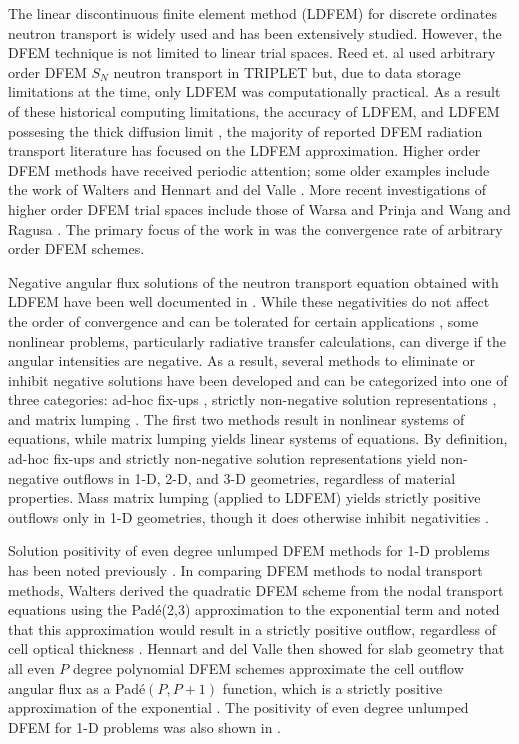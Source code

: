 The linear discontinuous finite element method (LDFEM) for discrete ordinates neutron transport is widely used and has been extensively studied\cite{ld_fine_mesh,hamilton,csz,adams}.  
However, the DFEM technique is not limited to linear trial spaces.
Reed et. al \cite{reed} used arbitrary order DFEM $S_N$ neutron transport in TRIPLET but, due to data storage limitations at the time, only LDFEM was computationally practical.
As a result of these historical computing limitations,  the accuracy of LDFEM\cite{larsen_nelson}, and LDFEM possesing the thick diffusion limit \cite{larsen_morel_asymptotics},
the majority of reported DFEM radiation transport literature has focused on the LDFEM approximation.
Higher order DFEM methods have received periodic attention; some older examples include the work of Walters \cite{walters} and Hennart and del Valle \cite{hennart_delvalle_2,hennart_delvalle_3}.
More recent investigations of higher order DFEM trial spaces include those of  Warsa and Prinja \cite{warsa_prinja} and Wang and Ragusa \cite{yaqi_ragusa,yaqi_ragusa2}.  
The primary focus of the work in \cite{hennart_delvalle_2,hennart_delvalle_3, warsa_prinja, yaqi_ragusa, yaqi_ragusa2} was the convergence rate of arbitrary order DFEM schemes. 

Negative angular flux solutions of the neutron transport equation obtained with LDFEM have been well documented in \cite{hamilton,csz,adams}.  
While these negativities do not affect the order of convergence and can be tolerated for certain applications \cite{lathrop}, some nonlinear problems, particularly radiative transfer calculations, can diverge if the angular intensities are negative.  
As a result, several methods to eliminate or inhibit negative solutions have been developed and can be categorized into one of three categories: ad-hoc fix-ups  \cite{hamilton}, strictly non-negative solution representations \cite{csz}, and matrix lumping \cite{adams}.  
The first two methods result in nonlinear systems of equations, while matrix lumping yields linear systems of equations.  
By definition, ad-hoc fix-ups and strictly non-negative solution representations yield non-negative outflows in 1-D, 2-D, and 3-D geometries, regardless of material properties.  
Mass matrix lumping (applied to LDFEM) yields strictly positive outflows only in 1-D geometries, though it does otherwise inhibit negativities \cite{adams}.   

Solution positivity of even degree unlumped DFEM methods for 1-D problems has been noted previously \cite{walters,hennart_delvalle_2,hennart_delvalle_3}.
In comparing DFEM methods to nodal transport methods, Walters derived the quadratic DFEM scheme from the nodal transport equations using the Pad\'{e}(2,3) approximation to the exponential term and noted that this approximation would result in a strictly positive outflow, regardless of cell optical thickness \cite{walters}.
Hennart and del Valle then showed for slab geometry that all even $P$ degree polynomial DFEM schemes approximate the cell outflow angular flux as a Pad\'{e}$(P,P+1)$ function, which is a strictly positive approximation of the exponential \cite{hennart_delvalle_2,hennart_delvalle_3}.
The positivity of even degree unlumped DFEM for 1-D problems was also shown in \cite{warsa_prinja}.


